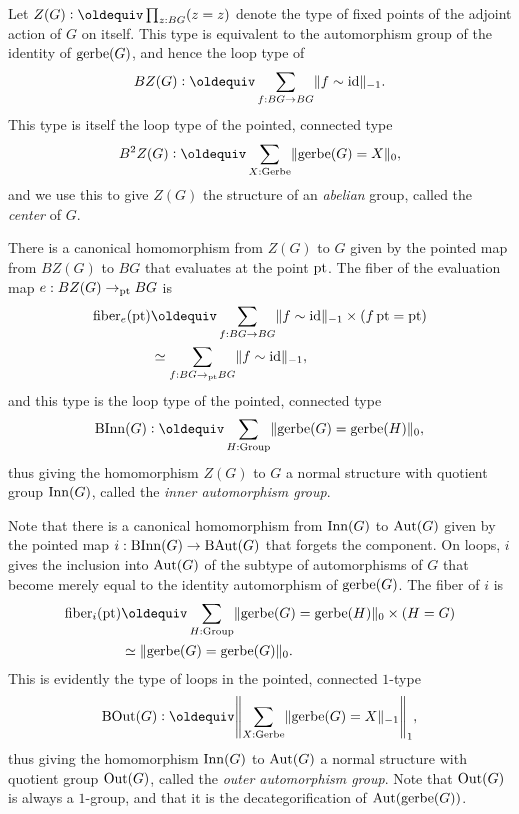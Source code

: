 \begin{definition}
  Let $Z(G) \defeq \prod_{z : BG}(z = z)$ denote the type of fixed points of the adjoint action of $G$ on itself.
  This type is equivalent to the automorphism group of the identity of $\operatorname{gerbe}(G)$,
  and hence the loop type of
  \[
    BZ(G) \defeq \sum_{f : BG \to BG} \merely{f \sim \id}.
  \]
  This type is itself the loop type of the pointed, connected type
  \[
    B^2Z(G) \defeq \sum_{X : \Gerbe}\Trunc{\gerbe(G) = X}_0,
  \]
  and we use this to give $Z(G)$ the structure of an \emph{abelian} group,
  called the \emph{center} of $G$.
\end{definition}
There is a canonical homomorphism from $Z(G)$ to $G$ given by the pointed map
from $BZ(G)$ to $BG$ that evaluates at the point ${\mathord{\mathrm{pt}}}$.
The fiber of the evaluation map $e : BZ(G) \to_{\mathord{\mathrm{pt}}} BG$ is
\begin{align*}
  \fiber_e(\pt)
  &\jdeq \sum_{f : BG \to BG} \merely{f \sim \id} \times (\mathop f \pt = \pt) \\
  &\equiv \sum_{f : BG \to_\pt BG} \merely{f \sim \id},
\end{align*}
and this type is the loop type of the pointed, connected type
\[
  \B\Inn(G) \defeq \sum_{H : \Group} \Trunc{\gerbe(G) = \gerbe(H)}_0,
\]
thus giving the homomorphism $Z(G)$ to $G$ a normal structure with
quotient group $\operatorname{Inn}(G)$, called the \emph{inner automorphism group}.

Note that there is a canonical homomorphism from $\operatorname{Inn}(G)$ to $\operatorname{Aut}(G)$
given by the pointed map $i : \operatorname{B}\!\operatorname{Inn}(G) \to \operatorname{B}\!\operatorname{Aut}(G)$ that forgets the component.
On loops, $i$ gives the inclusion into $\operatorname{Aut}(G)$ of the subtype of automorphisms of $G$
that become merely equal to the identity automorphism of $\operatorname{gerbe}(G)$.
The fiber of $i$ is
\begin{align*}
  \fiber_i(\pt)
  &\jdeq \sum_{H : \Group} \Trunc{\gerbe(G) = \gerbe(H)}_0 \times (H = G) \\
  &\equiv \Trunc{\gerbe(G) = \gerbe(G)}_0.
\end{align*}
This is evidently the type of loops in the pointed, connected $1$-type
\[
  \B\Out(G) \defeq \Trunc*{\sum_{X : \Gerbe}\merely{\gerbe(G) = X}}_1,
\]
thus giving the homomorphism $\operatorname{Inn}(G)$ to $\operatorname{Aut}(G)$ a normal structure with
quotient group $\operatorname{Out}(G)$, called the \emph{outer automorphism group}.
Note that $\operatorname{Out}(G)$ is always a $1$-group,
and that it is the decategorification of $\operatorname{Aut}(\operatorname{gerbe}(G))$.

